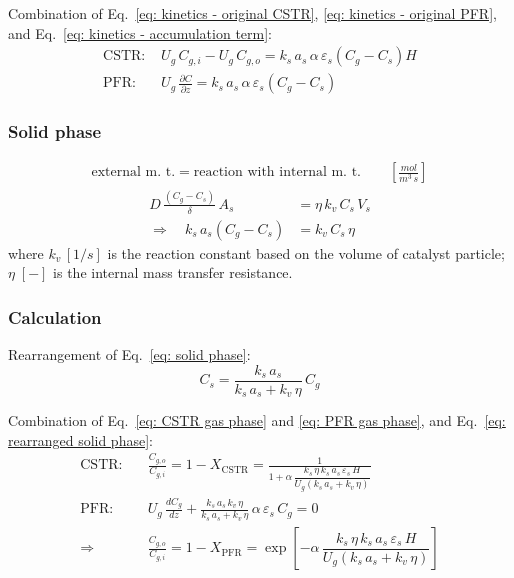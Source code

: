 Combination of Eq.~\eqref{eq: kinetics - original CSTR}, \eqref{eq: kinetics - original PFR}, and Eq.~\eqref{eq: kinetics - accumulation term}: 
\begin{align}
    \text{CSTR: }
    & U_g\, C_{g,i} - U_g\, C_{g,o} 
    = k_s \, a_s \, \alpha \, \varepsilon_s (C_g - C_s) H 
    \label{eq: CSTR gas phase} \\ 
    \text{PFR: }
    & U_g\,\frac{\partial C}{\partial z}
    = k_s \, a_s \, \alpha \, \varepsilon_s (C_g - C_s) 
    \label{eq: PFR gas phase}
\end{align}

\subsubsection{Solid phase}
\begin{align*}
    \text{external m. t.}
    = 
    \text{reaction with internal m. t.}
    \qquad \left[\si{\frac{mol}{m^3\, s}}\right]
\end{align*}
\begin{align}
    D\, \frac{(C_g - C_s)}{\delta}\, A_s
    &= \eta \, k_v \, C_s \, V_s \\
    \Longrightarrow \quad 
    k_s \, a_s (C_g - C_s) 
    &= k_v \, C_s \, \eta 
    \label{eq: solid phase}
\end{align}
where $k_v\, [\si{1/s}]$ is the reaction constant based on the volume of catalyst particle; $\eta\; [-]$ is the internal mass transfer resistance.

\subsubsection{Calculation}
Rearrangement of Eq.~\eqref{eq: solid phase}:
\begin{equation}
    C_s = \frac{k_s\, a_s}{k_s\, a_s + k_v\,\eta}\, C_g
    \label{eq: rearranged solid phase}
\end{equation}

Combination of Eq.~\eqref{eq: CSTR gas phase} and \eqref{eq: PFR gas phase}, and Eq.~\eqref{eq: rearranged solid phase}:
\begin{align}
    \text{CSTR:} \quad
    & \frac{C_{g,o}}{C_{g,i}} = 1- X_\text{CSTR}
    = \frac{1}{1+\alpha\, \dfrac{k_s\,\eta\,k_s\,a_s\,\varepsilon_s\,H}{U_g(k_s\, a_s + k_v\,\eta)}} \\
    \text{PFR:} \quad
    & U_g\,\frac{dC_{g}}{dz} + \frac{k_s\,a_s\,k_v\,\eta}{k_s\,a_s + k_v\,\eta}\,\alpha\,\varepsilon_s\,C_g = 0 \\
    \Longrightarrow \quad 
    & \frac{C_{g,o}}{C_{g,i}} = 1- X_\text{PFR}
    = \exp \left[
        -\alpha\, \dfrac{k_s\,\eta\,k_s\,a_s\,\varepsilon_s\,H}{U_g(k_s\, a_s + k_v\,\eta)}  
    \right]
\end{align}


